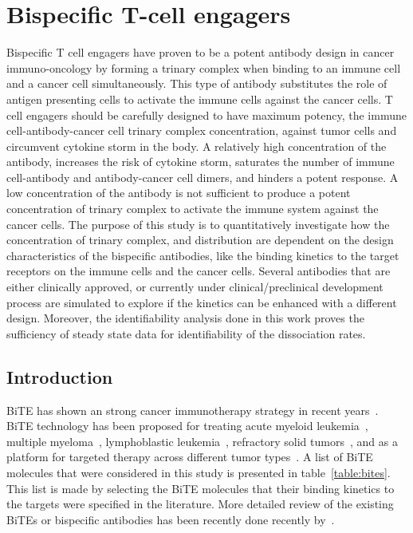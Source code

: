 \chapter{Bispecific T-cell engagers}
\label{chap:immune}

Bispecific T cell engagers have proven to be a potent antibody design in cancer immuno-oncology by forming a trinary complex when binding to an immune cell and a cancer cell simultaneously.
This type of antibody substitutes the role of antigen presenting cells to activate the immune cells against the cancer cells. 
T cell engagers should be carefully designed to have maximum potency, the immune cell-antibody-cancer cell trinary complex concentration, against tumor cells and circumvent cytokine storm in the body.
A relatively high concentration of the antibody, increases the risk of cytokine storm, saturates the number of immune cell-antibody and antibody-cancer cell dimers, and hinders a potent response.
A low concentration of the antibody is not sufficient to produce a potent concentration of trinary complex to activate the immune system against the cancer cells.
The purpose of this study is to quantitatively investigate how the concentration of trinary complex, and distribution are dependent on the design characteristics of the bispecific antibodies, like the binding kinetics to the target receptors on the immune cells and the cancer cells.
Several antibodies that are either clinically approved, or currently under clinical/preclinical development process are simulated to explore if the kinetics can be enhanced with a different design.
Moreover, the identifiability analysis done in this work proves the sufficiency of steady state data for identifiability of the dissociation rates.

\section{Introduction}

\ac{BiTE} has shown an strong cancer immunotherapy strategy in recent years~\cite{stieglmaier2015utilizing, yuraszeck2017translation, betts2020mechanistic, tian2021bispecific}. \ac{BiTE} technology has been proposed for treating acute myeloid leukemia~\cite{laszlo2014cellular}, multiple myeloma~\cite{hipp2017novel}, lymphoblastic leukemia~\cite{topp2014phase}, refractory solid tumors~\cite{kebenko2018multicenter}, and as a platform for targeted therapy across different tumor types~\cite{einsele2020bite}. A list of \ac{BiTE} molecules that were considered in this study is presented in table~\ref{table:bites}. This list is made by selecting the \ac{BiTE} molecules that their binding kinetics to the targets were specified in the literature. More detailed review of the existing \ac{BiTE}s or bispecific antibodies has been recently done recently by~\cite{gera2022evolution, tian2021bispecific, morcos2021quantitative}.


